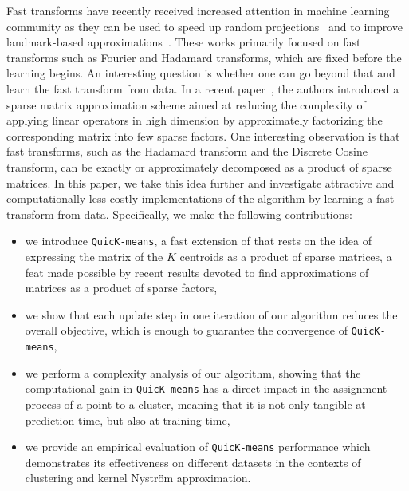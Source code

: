Fast transforms have recently received increased attention in machine learning community as they can be used  to speed up random projections~\cite{le2013fastfood,gittens2016revisiting} and to improve landmark-based approximations~\cite{si2016computationally}.
%
These works primarily focused on fast transforms such as Fourier and Hadamard transforms, which are fixed before the learning begins. An interesting question is whether one can go beyond that and learn the fast transform from data. 
%
In a recent paper~\cite{LeMagoarou2016Flexible}, the authors introduced a sparse matrix approximation scheme aimed  at  reducing the  complexity  of  applying  linear  operators  in  high  dimension by   approximately   factorizing   the   corresponding   matrix   into few   sparse   factors. One interesting observation is that fast transforms, such as the  Hadamard  transform  and  the  Discrete  Cosine  transform, can be exactly or approximately decomposed as a product of sparse matrices.
%
In this paper, we take this idea further and investigate attractive and computationally less costly implementations of the \kmeans algorithm by learning a fast transform from data.
%
Specifically, we make the following contributions:
\begin{itemize}
	\item we introduce \texttt{QuicK-means}, a fast extension of \kmeans that rests on the idea of expressing the matrix of the $K$ centroids as a product of sparse matrices, a feat made possible by recent results devoted to find approximations of matrices as a product of sparse factors,
	\item we show that each update step in one iteration of our algorithm  reduces the overall objective, which is enough to guarantee the convergence of \texttt{QuicK-means},
	\item we perform a complexity analysis of our algorithm, showing that the computational gain in \texttt{QuicK-means}  has a direct impact in the assignment process of a point to a cluster, meaning that it is not only tangible at prediction time, but also at training time,
	\item we provide an empirical evaluation of \texttt{QuicK-means}  performance which demonstrates its effectiveness on different datasets in the contexts of clustering and kernel Nystr\"om approximation.
\end{itemize}





